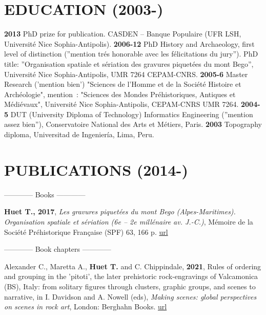 \documentclass{article}
\begin{document}
\section{EDUCATION (2003-)}

\textbf{2013 }PhD prize for publication. CASDEN -- Banque Populaire (UFR LSH, Universit\'{e} Nice Sophia-Antipolis).
\smallbreak
\textbf{2006-12 }PhD History and Archaeology, first level of distinction (''mention tr\'{e}s honorable avec les f\'{e}licitations du jury''). PhD title: ''Organisation spatiale et s\'{e}riation des gravures piquet\'{e}es du mont Bego'', Universit\'{e} Nice Sophia-Antipolis, UMR 7264 CEPAM-CNRS.
\smallbreak
\textbf{2005-6 }Master Research ('mention bien') "Sciences de l'Homme et de la Soci\'{e}t\'{e} Histoire et Arch\'{e}ologie", mention~: "Sciences des Mondes Pr\'{e}historiques, Antiques et M\'{e}di\'{e}vaux", Universit\'{e} Nice Sophia-Antipolis, CEPAM-CNRS UMR 7264.
\smallbreak
\textbf{2004-5 }DUT (University Diploma of Technology) Informatics Engineering (''mention assez bien''), Conservatoire National des Arts et M\'{e}tiers, Paris.
\smallbreak
\textbf{2003 } Topography diploma, Universitad de Ingenier\'{i}a, Lima, Peru.

\section{PUBLICATIONS (2014-)}

\begin{center}------------ Books ------------ \end{center}

\textbf{Huet T., 2017}, \textit{Les gravures piquet\'{e}es du mont Bego (Alpes-Maritimes). Organisation spatiale et s\'{e}riation (6e -- 2e mill\'{e}naire av. J.-C.)}, M\'{e}moire de la Soci\'{e}t\'{e} Pr\'{e}historique Fran\c{c}aise (SPF) 63, 166 p. \href{http://www.prehistoire.org/shop_515-40342-0-0/m63-2017-les-gravures-piquetees-du-mont-bego-alpes-maritimes-organisation-spatiale-et-seriation-vie-iie-millenaire-av.-j.-c.-t.-huet.html}{url} 
\bigbreak
\begin{center}------------ Book chapters ------------\end{center}
\smallbreak
Alexander C., Maretta A., \textbf{Huet T.} and C. Chippindale, \textbf{2021}, Rules of ordering and grouping in the 'pitoti', the later prehistoric rock-engravings of Valcamonica (BS), Italy: from solitary figures through clusters, graphic groups, and scenes to narrative, in I. Davidson and A. Nowell (eds), \textit{Making scenes: global perspectives on scenes in rock art}, London: Berghahn Books. \href{https://www.berghahnbooks.com/title/DavidsonMaking}{url}
\end{document}
